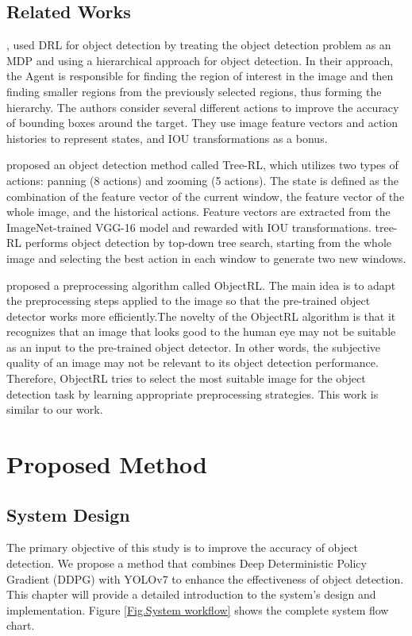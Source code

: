 \documentclass[PhD]{PHlab-thesis}
\begin{document}
\section{Related Works}
\cite{caicedo2015active}, \cite{bueno2017hierarchical} used DRL for object detection by treating the object detection problem as an MDP and using a hierarchical approach for object detection. In their approach, the Agent is responsible for finding the region of interest in the image and then finding smaller regions from the previously selected regions, thus forming the hierarchy. The authors consider several different actions to improve the accuracy of bounding boxes around the target. They use image feature vectors and action histories to represent states, and IOU transformations as a bonus.

\cite{jie2016tree} proposed an object detection method called Tree-RL, which utilizes two types of actions: panning (8 actions) and zooming (5 actions). The state is defined as the combination of the feature vector of the current window, the feature vector of the whole image, and the historical actions. Feature vectors are extracted from the ImageNet-trained VGG-16 model and rewarded with IOU transformations. tree-RL performs object detection by top-down tree search, starting from the whole image and selecting the best action in each window to generate two new windows.

\cite{nayak2020reinforcement} proposed a preprocessing algorithm called ObjectRL. The main idea is to adapt the preprocessing steps applied to the image so that the pre-trained object detector works more efficiently.The novelty of the ObjectRL algorithm is that it recognizes that an image that looks good to the human eye may not be suitable as an input to the pre-trained object detector. In other words, the subjective quality of an image may not be relevant to its object detection performance. Therefore, ObjectRL tries to select the most suitable image for the object detection task by learning appropriate preprocessing strategies. This work is similar to our work.


\chapter{Proposed Method}
\section{System Design}
The primary objective of this study is to improve the accuracy of object detection. We propose a method that combines Deep Deterministic Policy Gradient (DDPG) with YOLOv7 to enhance the effectiveness of object detection. This chapter will provide a detailed introduction to the system's design and implementation. Figure \ref{Fig.System workflow} shows the complete system flow chart.
\end{document}
